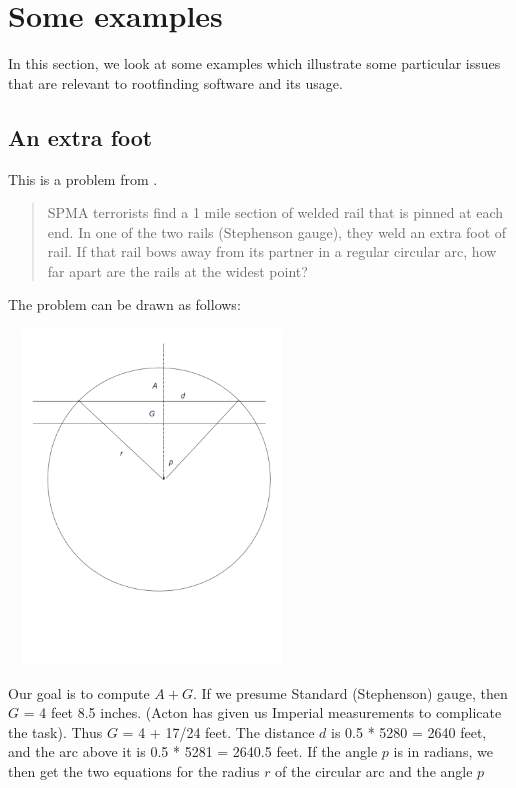 \documentclass[11pt,letterpaper]{article}
\begin{document}
\section{Some examples}


In this section, we look at some examples which illustrate some particular issues that are 
relevant to rootfinding software and its usage.

\subsection{An extra foot}

This is a problem from \cite{acton70} .


\begin{quote}
SPMA terrorists find a 1 mile section of welded rail that is pinned at each end. In one of the two rails (Stephenson gauge), they weld an extra foot of rail. If that rail bows away from its partner in a regular circular arc, how far apart are the rails at the widest point?
\end{quote}

The problem can be drawn as follows:

\includegraphics[height=3.5in, width=3in]{onefoot.pdf} 

Our goal is to compute $A+G$. If we presume Standard (Stephenson) gauge, then $G$ = 4 feet 8.5 inches. (Acton has given us Imperial measurements to complicate the task). Thus $G$ = 4 + 17/24 feet. The distance $d$ is 0.5 * 5280 = 2640 feet, and the arc above it is 0.5 * 5281 = 2640.5 feet. If the angle $p$ is in radians, we then get the two equations for the radius $r$ of the circular arc and the angle $p$
\end{document}

